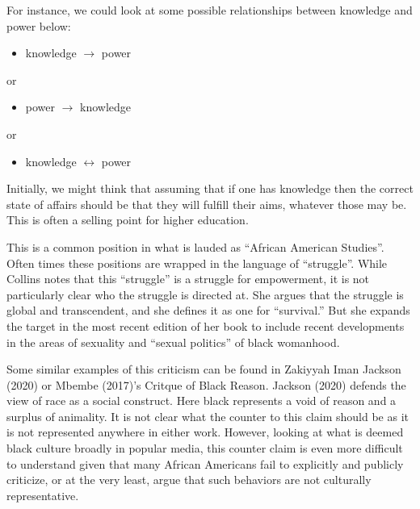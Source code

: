 \documentclass[
  letterpaper,
  DIV=11,
  numbers=noendperiod]{scrreprt}
\providecommand{\tightlist}{%
  \setlength{\itemsep}{0pt}\setlength{\parskip}{0pt}}\usepackage{longtable,booktabs,array}
\begin{document}
\begin{tcolorbox}[enhanced jigsaw, arc=.35mm, breakable, rightrule=.15mm, colback=white, colframe=quarto-callout-important-color-frame, bottomrule=.15mm, leftrule=.75mm, opacityback=0, toprule=.15mm, left=2mm]
\begin{tcolorbox}[enhanced jigsaw, arc=.35mm, breakable, rightrule=.15mm, colback=white, colframe=quarto-callout-tip-color-frame, bottomrule=.15mm, leftrule=.75mm, opacityback=0, toprule=.15mm, left=2mm]
For instance, we could look at some possible relationships between
knowledge and power below:

\begin{itemize}
\tightlist
\item
  knowledge \(\rightarrow\) power
\end{itemize}

or

\begin{itemize}
\tightlist
\item
  power \(\rightarrow\) knowledge
\end{itemize}

or

\begin{itemize}
\tightlist
\item
  knowledge \(\leftrightarrow\) power
\end{itemize}

Initially, we might think that assuming that if one has knowledge then
the correct state of affairs should be that they will fulfill their
aims, whatever those may be. This is often a selling point for higher
education.

This is a common position in what is lauded as ``African American
Studies''. Often times these positions are wrapped in the language of
``struggle''. While Collins notes that this ``struggle'' is a struggle
for empowerment, it is not particularly clear who the struggle is
directed at. She argues that the struggle is global and transcendent,
and she defines it as one for ``survival.'' But she expands the target
in the most recent edition of her book to include recent developments in
the areas of sexuality and ``sexual politics'' of black womanhood.

Some similar examples of this criticism can be found in Zakiyyah Iman
Jackson (2020) or Mbembe (2017)'s Critque of Black Reason. Jackson
(2020) defends the view of race as a social construct. Here black
represents a void of reason and a surplus of animality. It is not clear
what the counter to this claim should be as it is not represented
anywhere in either work. However, looking at what is deemed black
culture broadly in popular media, this counter claim is even more
difficult to understand given that many African Americans fail to
explicitly and publicly criticize, or at the very least, argue that such
behaviors are not culturally representative.


\end{tcolorbox}
\end{tcolorbox}
\end{document}

